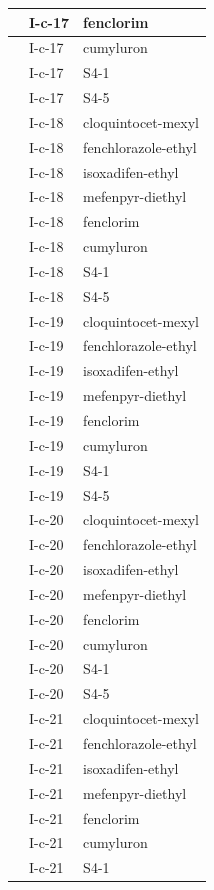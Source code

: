 \documentclass[11pt,a4paper]{article}
\begin{document}
\begin{table}[h]
\begin{tabular}{|l|l|l|}
 & I-c-17 & fenclorim \\ \hline
 & I-c-17 & cumyluron \\ \hline
 & I-c-17 & S4-1 \\ \hline
 & I-c-17 & S4-5 \\ \hline
 & I-c-18 & cloquintocet-mexyl \\ \hline
 & I-c-18 & fenchlorazole-ethyl \\ \hline
 & I-c-18 & isoxadifen-ethyl \\ \hline
 & I-c-18 & mefenpyr-diethyl \\ \hline
 & I-c-18 & fenclorim \\ \hline
 & I-c-18 & cumyluron \\ \hline
 & I-c-18 & S4-1 \\ \hline
 & I-c-18 & S4-5 \\ \hline
 & I-c-19 & cloquintocet-mexyl \\ \hline
 & I-c-19 & fenchlorazole-ethyl \\ \hline
 & I-c-19 & isoxadifen-ethyl \\ \hline
 & I-c-19 & mefenpyr-diethyl \\ \hline
 & I-c-19 & fenclorim \\ \hline
 & I-c-19 & cumyluron \\ \hline
 & I-c-19 & S4-1 \\ \hline
 & I-c-19 & S4-5 \\ \hline
 & I-c-20 & cloquintocet-mexyl \\ \hline
 & I-c-20 & fenchlorazole-ethyl \\ \hline
 & I-c-20 & isoxadifen-ethyl \\ \hline
 & I-c-20 & mefenpyr-diethyl \\ \hline
 & I-c-20 & fenclorim \\ \hline
 & I-c-20 & cumyluron \\ \hline
 & I-c-20 & S4-1 \\ \hline
 & I-c-20 & S4-5 \\ \hline
 & I-c-21 & cloquintocet-mexyl \\ \hline
 & I-c-21 & fenchlorazole-ethyl \\ \hline
 & I-c-21 & isoxadifen-ethyl \\ \hline
 & I-c-21 & mefenpyr-diethyl \\ \hline
 & I-c-21 & fenclorim \\ \hline
 & I-c-21 & cumyluron \\ \hline
 & I-c-21 & S4-1 \\ \hline

\end{tabular}
\end{table}
\end{document}
